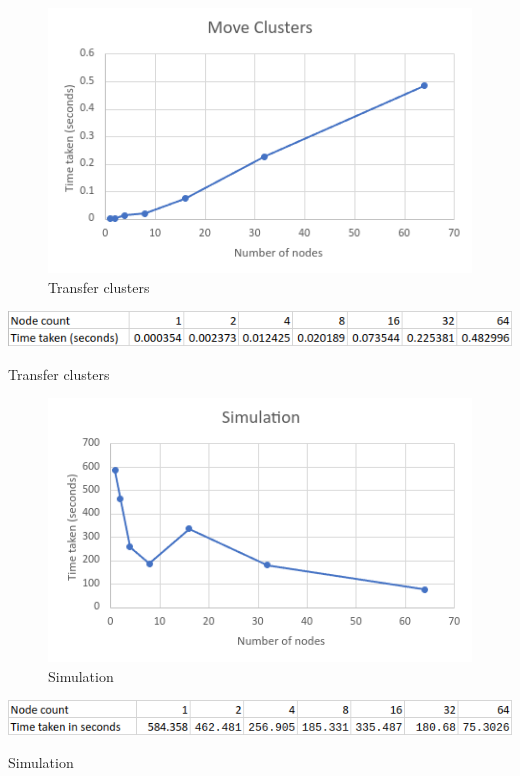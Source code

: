 \documentclass{article}
\begin{document}
\clearpage
\begin{figure}[!htb]
\includegraphics[width=\textwidth]{move-clusters.png}
\caption{Transfer clusters}
\label{fig:4}
\end{figure}
\begin{table}[!htb]
\includegraphics[width=\textwidth]{move-clusters-table.png}
\caption{Transfer clusters}
\label{tab:4}
\end{table}

\clearpage
\begin{figure}[!htb]
\includegraphics[width=\textwidth]{simulation-time.png}
\caption{Simulation}
\label{fig:5}
\end{figure}
\begin{table}[!htb]
\includegraphics[width=\textwidth]{simulation-time-table.png}
\caption{Simulation}
\label{tab:5}
\end{table}
\end{document}
